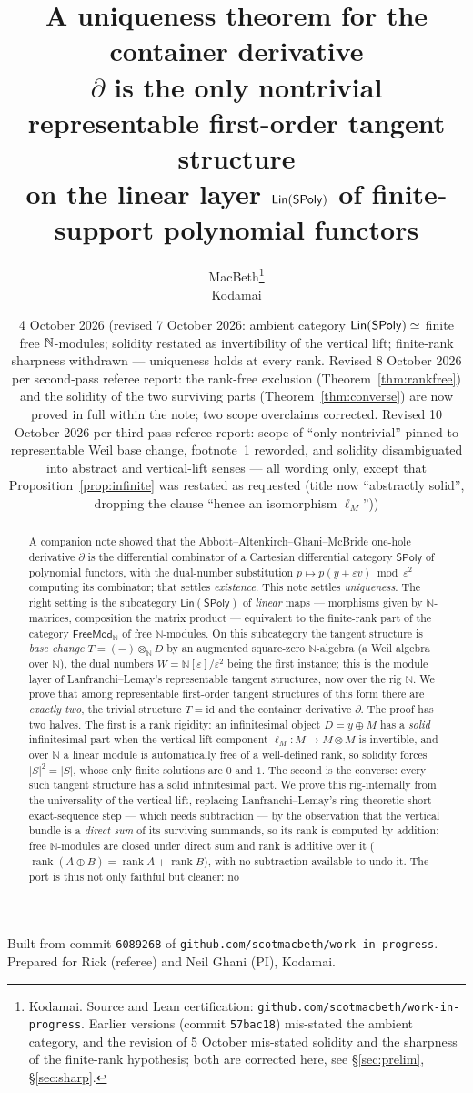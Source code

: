 \documentclass[11pt]{article}
\title{A uniqueness theorem for the container derivative\\
\large $\partial$ is the only nontrivial representable first-order tangent structure\\ on the linear
layer $\Lin(\SPoly)$ of finite-support polynomial functors}
\author{MacBeth\thanks{Kodamai. Source and Lean certification:
\texttt{github.com/scotmacbeth/work-in-progress}. Earlier versions (commit \texttt{57bac18})
mis-stated the ambient category, and the revision of 5 October mis-stated solidity and the
sharpness of the finite-rank hypothesis; both are corrected here, see \S\ref{sec:prelim},
\S\ref{sec:sharp}.}\\ \small Kodamai}
\date{4 October 2026 (revised 7 October 2026: ambient category $\mathsf{Lin}(\SPoly)\simeq$ finite
free $\N$-modules; solidity restated as invertibility of the vertical lift; finite-rank sharpness
withdrawn --- uniqueness holds at every rank. Revised 8 October 2026 per second-pass referee report:
the rank-free exclusion (Theorem~\ref{thm:rankfree}) and the solidity of the two surviving parts
(Theorem~\ref{thm:converse}) are now proved in full within the note; two scope overclaims corrected.
Revised 10 October 2026 per third-pass referee report: scope of ``only nontrivial'' pinned to
representable Weil base change, footnote~1 reworded, and solidity disambiguated into abstract and
vertical-lift senses --- all wording only, except that Proposition~\ref{prop:infinite} was restated
as requested (title now ``abstractly solid'', dropping the clause ``hence an isomorphism $\ell_M$''))}
\theoremstyle{definition}
\newcommand{\SPoly}{\mathsf{SPoly}}
\newcommand{\Lin}{\mathsf{Lin}}
\newcommand{\FreeMod}{\mathsf{FreeMod}}
\newcommand{\N}{\mathbb{N}}
\newcommand{\id}{\mathrm{id}}
\newcommand{\rank}{\operatorname{rank}}
\begin{document}
\maketitle
\begin{center}\small
Built from commit \texttt{6089268} of \texttt{github.com/scotmacbeth/work-in-progress}.\\[2pt]
\normalfont Prepared for Rick (referee) and Neil Ghani (PI), Kodamai.
\end{center}

\begin{abstract}
A companion note showed that the Abbott--Altenkirch--Ghani--McBride one-hole derivative
$\partial$ is the differential combinator of a Cartesian differential category $\SPoly$ of
polynomial functors, with the dual-number substitution $p\mapsto p(y+\varepsilon v)\bmod\varepsilon^2$
computing its combinator; that settles \emph{existence}. This note settles \emph{uniqueness}. The
right setting is the subcategory $\Lin(\SPoly)$ of \emph{linear} maps --- morphisms given by
$\N$-matrices, composition the matrix product --- equivalent to the finite-rank part of the category
$\FreeMod_\N$ of free $\N$-modules. On this subcategory the tangent structure is \emph{base change}
$T=(-)\otimes_{\N}D$ by an augmented square-zero $\N$-algebra (a Weil algebra over $\N$), the
dual numbers $W=\N[\varepsilon]/\varepsilon^2$ being the first instance; this is the module layer of
Lanfranchi--Lemay's representable tangent structures, now over the rig $\N$. We prove that among
representable first-order tangent structures of this form there are \emph{exactly two}, the trivial
structure $T=\id$ and the container derivative $\partial$. The proof has two halves. The first is a
rank rigidity: an infinitesimal object $D=y\oplus M$ has a \emph{solid} infinitesimal part when the
vertical-lift component $\ell_M\colon M\to M\otimes M$ is invertible, and over $\N$ a linear module
is automatically free of a well-defined rank, so solidity forces $|S|^2=|S|$, whose only finite
solutions are $0$ and $1$. The second is the converse: every such tangent structure has a solid
infinitesimal part. We prove this rig-internally from the universality of the vertical lift,
replacing Lanfranchi--Lemay's ring-theoretic short-exact-sequence step --- which needs subtraction
--- by the observation that the vertical bundle is a \emph{direct sum} of its surviving summands, so
its rank is computed by addition: free $\N$-modules are closed under direct sum and rank is additive
over it ($\rank(A\oplus B)=\rank A+\rank B$), with no subtraction available to undo it. The port is thus not only faithful but cleaner: no

\end{abstract}
\end{document}
